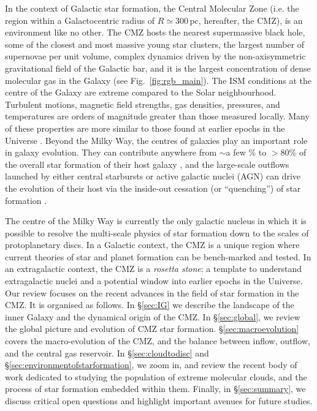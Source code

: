 In the context of Galactic star formation, the Central Molecular Zone (i.e. the region within a Galactocentric radius of $R\simeq300$\,pc, hereafter, the CMZ), is an environment like no other. The CMZ hosts the nearest supermassive black hole, some of the closest and most massive young star clusters, the largest number of supernovae per unit volume, complex dynamics driven by the non-axisymmetric gravitational field of the Galactic bar, and it is the largest concentration of dense molecular gas in the Galaxy (see Fig.~\ref{fig:rgb_main}).
The ISM conditions at the centre of the Galaxy are extreme compared to the Solar neighbourhood. Turbulent motions, magnetic field strengths, gas densities, pressures, and temperatures are orders of magnitude greater than those measured locally. 
Many of these properties are more similar to those found at earlier epochs in the Universe \citep{Kruijssen2013}. 
Beyond the Milky Way, the centres of galaxies play an important role in galaxy evolution. They can contribute anywhere from $\sim$a few \% to $>80$\% of the overall star formation of their host galaxy \citep{Kormendy2004}, and the large-scale outflows launched by either central starbursts or active galactic nuclei (AGN) can drive the evolution of their host via the inside-out cessation (or ``quenching'') of star formation \citep{Veilleux2020}. 

The centre of the Milky Way is currently the only galactic nucleus in which it is possible to resolve the multi-scale physics of star formation down to the scales of protoplanetary discs. 
In a Galactic context, the CMZ is a unique region where current theories of star and planet formation can be bench-marked and tested.
In an extragalactic context, the CMZ is a \emph{rosetta stone}: a template to understand extragalactic nuclei and a potential window into earlier epochs in the Universe. Our review focuses on the recent advances in the field of star formation in the CMZ. It is organised as follows. In \S\ref{sec:IG} we describe the landscape of the inner Galaxy and the dynamical origin of the CMZ. In \S\ref{sec:global}, we review the global picture and evolution of CMZ star formation. \S\ref{sec:macroevolution} covers the macro-evolution of the CMZ, and the balance between inflow, outflow, and the central gas reservoir. In \S\ref{sec:cloudtodisc} and \S\ref{sec:environmentofstarformation}, we zoom in, and review the recent body of work dedicated to studying the population of extreme molecular clouds, and the process of star formation embedded within them. Finally, in \S\ref{sec:summary}, we discuss critical open questions and highlight important avenues for future studies.


